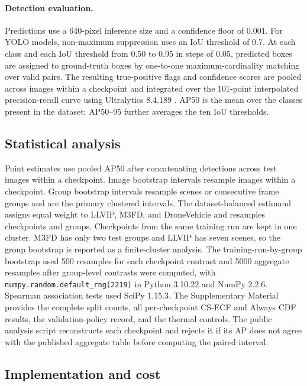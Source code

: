 \documentclass[preprint,11pt]{elsarticle}
\begin{document}
\paragraph{Detection evaluation.}
Predictions use a 640-pixel inference size and a confidence floor of
\(0.001\). For YOLO models, non-maximum suppression uses an IoU threshold of
\(0.7\). At each class and each IoU threshold from 0.50 to 0.95 in steps of
0.05, predicted boxes are assigned to ground-truth boxes by one-to-one
maximum-cardinality matching over valid pairs. The resulting true-positive
flags and confidence scores are pooled across images within a checkpoint and
integrated over the 101-point interpolated precision-recall curve using
Ultralytics 8.4.189 \cite{jocher2026ultralytics}. AP50 is the mean over the
classes present in the dataset; AP50--95 further averages the ten IoU
thresholds.

\subsection{Statistical analysis}

Point estimates use pooled AP50 after concatenating detections across test
images within a checkpoint. Image bootstrap intervals resample images within a
checkpoint. Group bootstrap intervals resample scenes or consecutive frame
groups and are the primary clustered intervals. The dataset-balanced estimand
assigns equal weight to LLVIP, M3FD, and DroneVehicle and resamples checkpoints
and groups. Checkpoints from the same training run are kept in one cluster.
M3FD has only two test groups and LLVIP has seven scenes, so the group bootstrap
is reported as a finite-cluster analysis. The training-run-by-group bootstrap
used 500 resamples for each checkpoint contrast and 5000 aggregate resamples
after group-level contrasts were computed, with
\texttt{numpy.random.default\_rng(2219)} in Python 3.10.22 and NumPy 2.2.6.
Spearman association tests used SciPy 1.15.3.
The Supplementary Material provides the complete split counts, all
per-checkpoint CS-ECF and Always CDF results, the validation-policy record, and
the thermal controls. The public analysis script reconstructs each checkpoint
and rejects it if its AP does not agree with the published aggregate table
before computing the paired interval.

\subsection{Implementation and cost}
\end{document}
